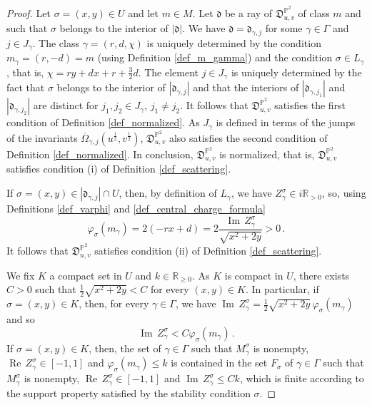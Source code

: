 \documentclass[12pt, a4paper]{amsart}
\newcommand\PP{\mathbb P}
\newcommand\R{\mathbb R}
\newcommand\fd{\mathfrak d}
\newcommand\fD{\mathfrak D}
\newcommand\Rea{\operatorname{Re}\,}
\newcommand\Ima{\operatorname{Im}\,}
\begin{document}
\begin{proof}
Let $\sigma=(x,y) \in U$ and let $m \in M$.
Let $\fd$ be a ray of 
$\fD_{u,v}^{\PP^2}$ of class $m$ and such that $\sigma$ belongs to the interior of 
$|\fd|$. We have $\fd=\fd_{\gamma,j}$ for some $\gamma \in \Gamma$ and $j \in J_\gamma$. The class $\gamma=(r,d,\chi)$ is uniquely determined by the condition 
$m_\gamma=(r,-d)=m$ (using Definition \ref{def_m_gamma}) and the condition 
$\sigma \in L_\gamma$, that is, 
$\chi=ry+dx+r+\frac{3}{2}d$. The element $j \in J_\gamma$ is uniquely determined by the fact that 
$\sigma$ belongs to the interior of $|\fd_{\gamma,j}|$ and that the interiors of $|\fd_{\gamma,j_1}|$ and 
$|\fd_{\gamma,j_2}|$ are distinct for 
$j_1,j_2 \in J_\gamma$, $j_1 \neq j_2$.
It follows that $\fD^{\PP^2}_{u,v}$
satisfies the first condition of Definition 
\ref{def_normalized}.
As
$J_\gamma$ is defined in terms of the jumps of 
the invariants $\overline{\Omega}_{\gamma,j}(u^{\frac{1}{2}},
v^{\frac{1}{2}})$, $\fD^{\PP^2}_{u,v}$
also satisfies the second condition of 
Definition \ref{def_normalized}. In conclusion, 
$\fD^{\PP^2}_{u,v}$ is normalized, that is,
$\fD^{\PP^2}_{u,v}$ satisfies condition (i) of Definition \ref{def_scattering}. 


If $\sigma=(x,y) \in |\fd_{\gamma,j}| \cap U$, then, by definition of 
$L_\gamma$, we have 
$Z_\gamma^{\sigma} \in i \R_{>0}$, so, using Definitions \ref{def_varphi} and 
\ref{def_central_charge_formula}
\[\varphi_\sigma ( m_\gamma)=2(-rx+d)=2 \frac{\Ima Z_\gamma^{\sigma}}{\sqrt{x^2+2y}}>0\,.\]
It follows that $\fD^{\PP^2}_{u,v}$ satisfies condition (ii) of Definition \ref{def_scattering}.

We fix $K$ a compact set in $U$ and $k \in \R_{\geqslant 0}$. As 
$K$ is compact in $U$, there exists $C >0$ such that $\frac{1}{2}\sqrt{x^2+2y}<C$ for every $(x,y)\in K$. In particular, if 
$\sigma=(x,y) \in K$, then, for every $\gamma \in \Gamma$, we have
$\Ima Z_{\gamma}^{\sigma}=\frac{1}{2}\sqrt{x^2+2y} \, \varphi_\sigma (m_\gamma)$
and so 
\[\Ima Z_{\gamma}^\sigma<C \varphi_\sigma (m_\gamma) \,.\]
If $\sigma=(x,y) \in K$, then, the set of $\gamma \in \Gamma$ such that $M_\gamma^{\sigma}$ is nonempty,
$\Rea Z_{\gamma}^{\sigma} \in [-1,1]$ and $\varphi_\sigma(m_\gamma) \leqslant k$ is contained in the set $F_\sigma$ of $\gamma \in \Gamma$ 
such that $M_\gamma^\sigma$ is nonempty, $\Rea Z_{\gamma}^{\sigma} \in [-1,1]$ and 
$\Ima Z_{\gamma}^\sigma \leqslant Ck$, which is finite
according to the support property satisfied by the stability condition 
$\sigma$. 


\end{proof}
\end{document}
